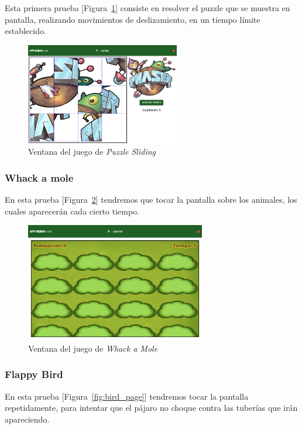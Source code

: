 Esta primera prueba [Figura~\ref{fig:puzzle_page}] consiste en resolver el puzzle que se muestra en pantalla, realizando movimientos de deslizamiento, en un tiempo límite establecido.

\begin{figure}[!h]
    \centering
    \includegraphics[width=0.6\textwidth, keepaspectratio]{imaxes/application/puzle-sliding-page.png}
    \caption{Ventana del juego de \textit{Puzzle Sliding}}
    \label{fig:puzzle_page}
\end{figure}

\subsubsection{Whack a mole}
En esta prueba [Figura~\ref{fig:mole_page}] tendremos que tocar la pantalla sobre los animales, los cuales aparecerán cada cierto tiempo.

\begin{figure}[H]
    \centering
    \includegraphics[width=0.7\textwidth, keepaspectratio]{imaxes/application/whack-mole-page.png}
    \caption{Ventana del juego de \textit{Whack a Mole}}
    \label{fig:mole_page}
\end{figure}

\subsubsection{Flappy Bird}
En esta prueba [Figura~\ref{fig:bird_page}] tendremos tocar la pantalla repetidamente, para intentar que el pájaro no choque contra las tuberías que irán apareciendo.

